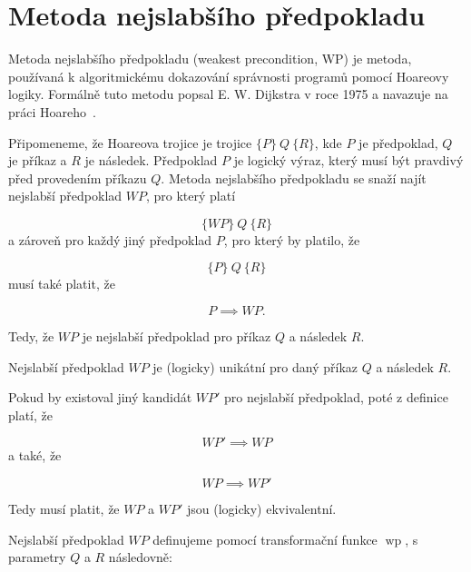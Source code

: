 \chapter{Metoda nejslabšího předpokladu}
\label{ch:metoda-nejslabsiho-predpokladu}

Metoda nejslabšího předpokladu (weakest precondition, WP) je metoda,
používaná k algoritmickému dokazování správnosti programů pomocí Hoareovy logiky.
Formálně tuto metodu popsal E. W. Dijkstra v roce 1975 a navazuje na práci Hoareho~\cite{Dijkstra1975}.

Připomeneme, že Hoareova trojice je trojice $ \{ P \} \ Q \ \{ R \} $,
kde $P$ je předpoklad, $Q$ je příkaz a $R$ je následek.
Předpoklad $P$ je logický výraz, který musí být pravdivý před provedením příkazu $Q$.
Metoda nejslabšího předpokladu se snaží najít nejslabší předpoklad $\mathit{WP}$, pro který platí

\begin{equation*}
    \{ \mathit{WP} \} \ Q \ \{ R \}
\end{equation*}
a zároveň pro každý jiný předpoklad $P$, pro který by platilo, že

\begin{equation*}
    \{ P \} \ Q \ \{ R \}
\end{equation*}
musí také platit, že

\begin{equation*}
    P \implies \mathit{WP}.
\end{equation*}

Tedy, že $\mathit{WP}$ je nejslabší předpoklad pro příkaz $Q$ a následek $R$.

\begin{remark}
    Nejslabší předpoklad $\mathit{WP}$ je (logicky) unikátní pro daný příkaz $Q$ a následek $R$.
\end{remark}

Pokud by existoval jiný kandidát $\mathit{WP}'$ pro nejslabší předpoklad,
poté z definice platí, že

\begin{equation*}
    \mathit{WP}' \implies \mathit{WP}
\end{equation*}
a také, že

\begin{equation*}
    \mathit{WP} \implies \mathit{WP}'
\end{equation*}

Tedy musí platit, že $\mathit{WP}$ a $\mathit{WP}'$ jsou (logicky) ekvivalentní.

Nejslabší předpoklad $\mathit{WP}$ definujeme pomocí transformační funkce $\operatorname{wp}$,
s parametry $Q$ a $R$ následovně:

